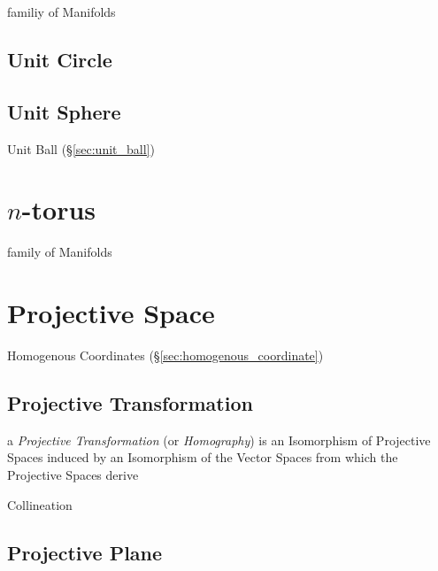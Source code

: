 familiy of Manifolds



\subsection{Unit Circle}\label{sec:unit_circle}

\subsection{Unit Sphere}\label{sec:unit_sphere}

Unit Ball (\S\ref{sec:unit_ball})



\section{$n$-torus}\label{sec:n_torus}

family of Manifolds



\section{Projective Space}\label{sec:projective_space}

Homogenous Coordinates (\S\ref{sec:homogenous_coordinate})



\subsection{Projective Transformation}
\label{sec:projective_transformation}

a \emph{Projective Transformation} (or \emph{Homography}) is an
Isomorphism of Projective Spaces induced by an Isomorphism of the
Vector Spaces from which the Projective Spaces derive

Collineation



\subsection{Projective Plane}\label{sec:projective_plane}

